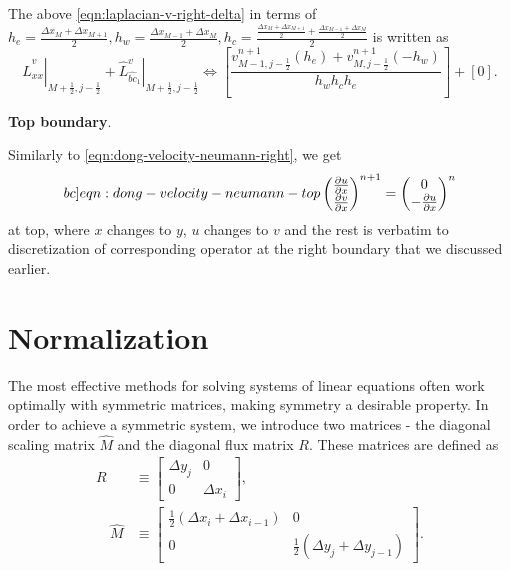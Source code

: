 \documentclass{article}
\numberwithin{equation}{section}
\begin{document}
The above \cref{eqn:laplacian-v-right-delta} in terms of $h_e=\frac{\Delta x_{M} + \Delta x_{M+1}}{2},h_w=\frac{\Delta x_{M-1} + \Delta x_M}{2},h_c=\frac{\frac{\Delta x_M + \Delta x_{M+1}}{2}+\frac{\Delta x_{M-1} + \Delta x_{M}}{2}}{2}$ is written as
\begin{equation}\label{eqn:laplacian-v-right}
	\left.\hat{L}^v_{xx}\right|_{M+\frac{1}{2},j-\frac{1}{2}}+\left.\hat{L}^v_{\hat{bc}_1}\right|_{M+\frac{1}{2},j-\frac{1}{2}}
	\iff 
	\left[\frac{
	v^{n+1}_{M-1,j-\frac{1}{2}}\left(h_e\right)
	+v^{n+1}_{M,j-\frac{1}{2}}\left(-h_w\right)
}
{ h_w h_c h_e }\right]+\left[0\right].
\end{equation}



\textbf{Top boundary}.



Similarly to \cref{eqn:dong-velocity-neumann-right}, we get 
\begin{equation}\label[bc]{eqn:dong-velocity-neumann-top}
\begin{pmatrix}{}
	\frac{\partial{u}}{\partial x}\\
	\frac{\partial{v}}{\partial x}
\end{pmatrix}^{n+1}
=	
\begin{pmatrix}
	0\\
	 -\frac{\partial u}{\partial x}
\end{pmatrix}^n
\end{equation} 
at top, where $x$ changes to $y$, $u$ changes to $v$ and the rest is verbatim to discretization of corresponding operator at the right boundary that we discussed earlier.






\pagebreak
\section{Normalization}\label{sec:normalization}

The most effective methods for solving systems of linear equations often work optimally with symmetric matrices, making symmetry a desirable property. In order to achieve a symmetric system, we introduce two matrices - the diagonal scaling matrix $\hat{M}$ and the diagonal flux matrix $R$. These matrices are defined as
\begin{align*}
R &\equiv\left[\begin{array}{cc}
\Delta y_j & 0 \\
0 & \Delta x_i
\end{array}\right], \\
\quad \hat{M} & \equiv\left[\begin{array}{cc}
\frac{1}{2}\left(\Delta x_i+\Delta x_{i-1}\right) & 0 \\
0 & \frac{1}{2}\left(\Delta y_j+\Delta y_{j-1}\right)
\end{array}\right].
\end{align*}
\end{document}
